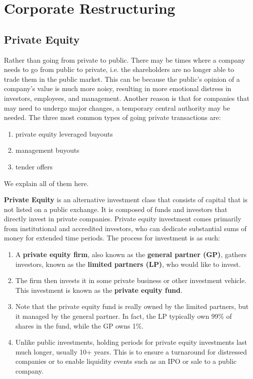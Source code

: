 \documentclass{article}
\begin{document}
\section{Corporate Restructuring}

  \subsection{Private Equity}

    Rather than going from private to public. There may be times where a company needs to go from public to private, i.e. the shareholders are no longer able to trade them in the public market. This can be because the public's opinion of a company's value is much more noisy, resulting in more emotional distress in investors, employees, and management. Another reason is that for companies that may need to undergo major changes, a temporary central authority may be needed. The three most common types of going private transactions are: 
    \begin{enumerate}
      \item private equity leveraged buyouts
      \item management buyouts
      \item tender offers
    \end{enumerate}

    We explain all of them here. 

    \begin{definition}
      \textbf{Private Equity} is an alternative investment class that consists of capital that is not listed on a public exchange. It is composed of funds and investors that directly invest in private companies. Private equity investment comes primarily from institutional and accredited investors, who can dedicate substantial sums of money for extended time periods. The process for investment is as such: 
      \begin{enumerate}
        \item A \textbf{private equity firm}, also known as the \textbf{general partner (GP)}, gathers investors, known as the \textbf{limited partners (LP)}, who would like to invest. 
        \item The firm then invests it in some private business or other investment vehicle. This investment is known as the \textbf{private equity fund}. 
        \item Note that the private equity fund is really owned by the limited partners, but it managed by the general partner. In fact, the LP typically own 99\% of shares in the fund, while the GP owns 1\%. 
        \item Unlike public investments, holding periods for private equity investments last much longer, usually 10+ years. This is to ensure a turnaround for distressed companies or to enable liquidity events such as an IPO or sale to a public company.  
      \end{enumerate}
    \end{definition}
\end{document}
